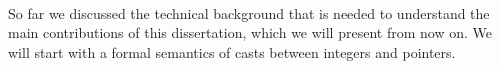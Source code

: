


\paragraph*{}

So far we discussed the technical background that is needed to understand the main contributions of
this dissertation, which we will present from now on.  We will start with a formal semantics of
casts between integers and pointers.


